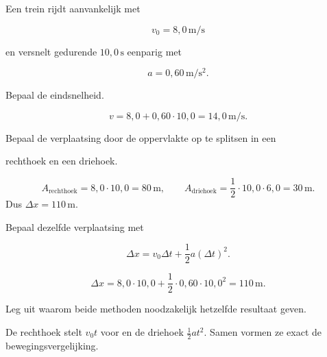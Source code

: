 \documentclass{ximera}
\begin{document}
\begin{oefening}{\oefU\ESS}

Een trein rijdt aanvankelijk met

\[v_0=8,0\,\mathrm{m/s}\]

en versnelt gedurende $10,0\,\mathrm{s}$ eenparig met

\[a=0,60\,\mathrm{m/s^2}.\]

\begin{question}

Bepaal de eindsnelheid.

\begin{oplossing}
\[v=8,0+0,60\cdot10,0=14,0\,\mathrm{m/s}.\]
\end{oplossing}

\end{question}

\begin{question}

Bepaal de verplaatsing door de oppervlakte op te splitsen in een

rechthoek en een driehoek.

\begin{oplossing}
\[A_{\mathrm{rechthoek}}=8,0\cdot10,0=80\,\mathrm{m}, \qquad A_{\mathrm{driehoek}}=\frac12\cdot10,0\cdot6,0=30\,\mathrm{m}.\]
Dus \(\Delta x=110\,\mathrm{m}\).
\end{oplossing}

\end{question}

\begin{question}

Bepaal dezelfde verplaatsing met

\[\Delta x=v_0\Delta t+\frac12a(\Delta t)^2.\]

\begin{oplossing}
\[\Delta x=8,0\cdot10,0+\frac12\cdot0,60\cdot10,0^2=110\,\mathrm{m}.\]
\end{oplossing}

\end{question}

\begin{question}

Leg uit waarom beide methoden noodzakelijk hetzelfde resultaat geven.

\begin{oplossing}
De rechthoek stelt \(v_0t\) voor en de driehoek \(\frac12at^2\). Samen vormen ze exact de bewegingsvergelijking.
\end{oplossing}

\end{question}

\end{oefening}
\end{document}
